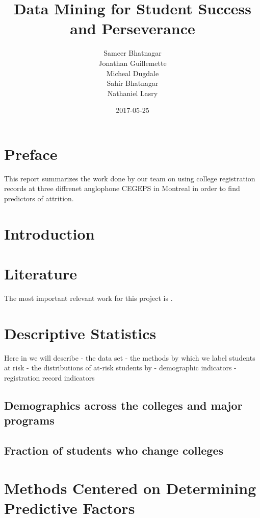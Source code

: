 \documentclass[]{book}
\title{Data Mining for Student Success and Perseverance}
\author{Sameer Bhatnagar \\ Jonathan Guillemette \\ Micheal Dugdale \\ Sahir Bhatnagar \\ Nathaniel Lasry}
\date{2017-05-25}
\theoremstyle{definition}
\theoremstyle{definition}
\theoremstyle{remark}
\begin{document}
\maketitle

{
\setcounter{tocdepth}{1}
\tableofcontents
}
\chapter{Preface}\label{preface}

This report summarizes the work done by our team on using college
registration records at three diffrenet anglophone CEGEPS in Montreal in
order to find predictors of attrition.

\chapter{Introduction}\label{intro}

\chapter{Literature}\label{literature}

The most important relevant work for this project is
\citep{jorgensen_predicting_2009}.

\chapter{Descriptive Statistics}\label{descriptive-statistics}

Here in we will describe - the data set - the methods by which we label
students at risk - the distributions of at-risk students by -
demographic indicators - registration record indicators

\section{Demographics across the colleges and major
programs}\label{demographics-across-the-colleges-and-major-programs}

\section{Fraction of students who change
colleges}\label{fraction-of-students-who-change-colleges}

\chapter{Methods Centered on Determining Predictive
Factors}\label{methods-centered-on-determining-predictive-factors}
\end{document}
